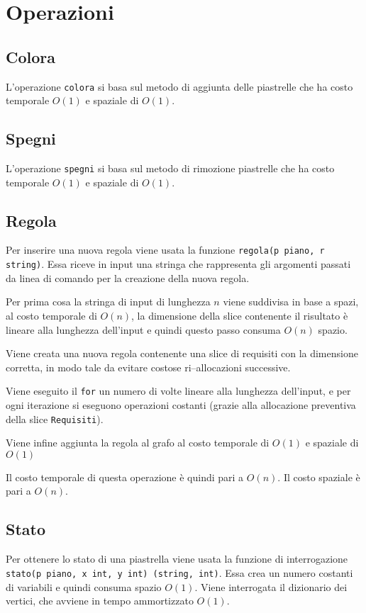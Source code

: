 \documentclass[a4paper,12pt]{article}
\begin{document}
	\section{Operazioni}
	
	\subsection{Colora}
	L'operazione \texttt{colora} si basa sul metodo di aggiunta delle piastrelle che ha costo temporale \(O(1)\) e spaziale di \(O(1)\).
	
	\subsection{Spegni}
	L'operazione \texttt{spegni} si basa sul metodo di rimozione piastrelle che ha costo temporale \(O(1)\) e spaziale di \(O(1)\).
	
	\subsection{Regola}
	Per inserire una nuova regola viene usata la funzione \texttt{regola(p piano, r string)}.
	Essa riceve in input una stringa che rappresenta gli argomenti passati da linea di comando per la creazione della nuova regola.
	
	Per prima cosa la stringa di input di lunghezza \(n\) viene suddivisa in base a spazi, al costo temporale di \(O(n)\), la dimensione della slice contenente il risultato è lineare alla lunghezza dell'input e quindi questo passo consuma \(O(n)\) spazio.
	
	Viene creata una nuova regola contenente una slice di requisiti con la dimensione corretta, in modo tale da evitare costose ri--allocazioni successive.
	
	Viene eseguito il \texttt{for} un numero di volte lineare alla lunghezza dell'input, e per ogni iterazione si eseguono operazioni costanti (grazie alla allocazione preventiva della slice \texttt{Requisiti}).
	
	Viene infine aggiunta la regola al grafo al costo temporale di \(O(1)\) e spaziale di \(O(1)\)
	
	Il costo temporale di questa operazione è quindi pari a \(O(n)\).
	Il costo spaziale è pari a \(O(n)\).
	
	\subsection{Stato}
	Per ottenere lo stato di una piastrella viene usata la funzione di interrogazione \texttt{stato(p piano, x int, y int) (string, int)}.
	Essa crea un numero costanti di variabili e quindi consuma spazio \(O(1)\).
	Viene interrogata il dizionario dei vertici, che avviene in tempo ammortizzato \(O(1)\).
	
\end{document}
